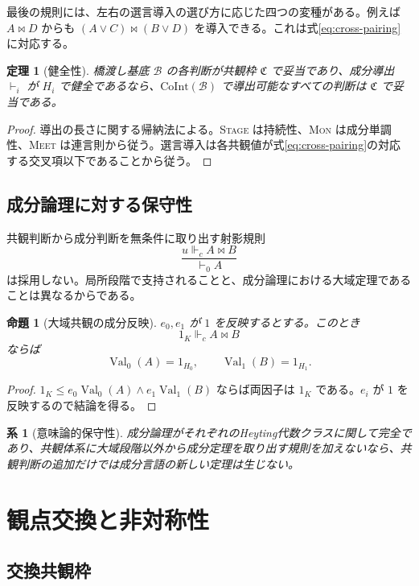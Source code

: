 \documentclass[a4paper,11pt]{ltjsarticle}
\theoremstyle{definition}
\theoremstyle{plain}
\newtheorem{theorem}[definition]{定理}
\newtheorem{proposition}[definition]{命題}
\newtheorem{corollary}[definition]{系}
\newcommand{\CoInt}{\mathrm{CoInt}}
\newcommand{\Val}{\operatorname{Val}}
\newcommand{\forcesc}{\Vdash_{\!c}}
\begin{document}
最後の規則には、左右の選言導入の選び方に応じた四つの変種がある。例えば $A\bowtie D$ からも $(A\lor C)\bowtie(B\lor D)$ を導入できる。これは式\eqref{eq:cross-pairing}に対応する。

\begin{theorem}[健全性]
橋渡し基底 $\mathcal B$ の各判断が共観枠 $\mathfrak C$ で妥当であり、成分導出 $\vdash_i$ が $H_i$ で健全であるなら、$\CoInt(\mathcal B)$ で導出可能なすべての判断は $\mathfrak C$ で妥当である。
\end{theorem}

\begin{proof}
導出の長さに関する帰納法による。\textsc{Stage} は持続性、\textsc{Mon} は成分単調性、\textsc{Meet} は連言則から従う。選言導入は各共観値が式\eqref{eq:cross-pairing}の対応する交叉項以下であることから従う。
\end{proof}

\subsection{成分論理に対する保守性}

共観判断から成分判断を無条件に取り出す射影規則
\[
 \frac{u\forcesc A\bowtie B}{\vdash_0 A}
\]
は採用しない。局所段階で支持されることと、成分論理における大域定理であることは異なるからである。

\begin{proposition}[大域共観の成分反映]
$e_0,e_1$ が $1$ を反映するとする。このとき
\[
 1_K\forcesc A\bowtie B
\]
ならば
\[
 \Val_0(A)=1_{H_0},
 \qquad
 \Val_1(B)=1_{H_1}.
\]
\end{proposition}

\begin{proof}
$1_K\leq e_0\Val_0(A)\wedge e_1\Val_1(B)$ ならば両因子は $1_K$ である。$e_i$ が $1$ を反映するので結論を得る。
\end{proof}

\begin{corollary}[意味論的保守性]
成分論理がそれぞれのHeyting代数クラスに関して完全であり、共観体系に大域段階以外から成分定理を取り出す規則を加えないなら、共観判断の追加だけでは成分言語の新しい定理は生じない。
\end{corollary}

\section{観点交換と非対称性}

\subsection{交換共観枠}
\end{document}
